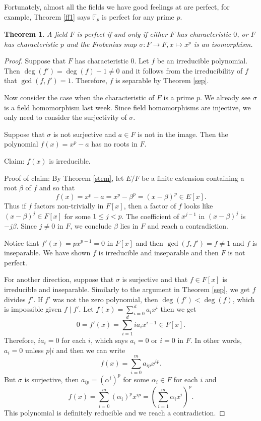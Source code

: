 \documentclass[12pt]{report}
\newtheorem{theorem}{Theorem}[section]
\theoremstyle{definition}
\newcommand{\FF}{\mathbb{F}}
\begin{document}
Fortunately, almost all the fields we have good feelings at are perfect, for example, Theorem \ref{ff1} says $\FF_p$ is perfect for any prime $p$.

\begin{theorem}
	A field $F$ is perfect if and only if either $F$ has characteristic $0$, or $F$ has characteristic $p$ and the Frobenius map $\sigma: F\to F, x\mapsto x^p$ is an isomorphism.
\end{theorem}

\begin{proof}
	Suppose that $F$ has characteristic 0. Let $f$ be an irreducible polynomial. Then $\deg(f')=\deg(f)-1\not=0$ and it follows from the irreducibility of $f$ that $\gcd(f,f')=1$. Therefore, $f$ is separable by Theorem \ref{sep}.

	Now consider the case when the characteristic of $F$ is a prime $p$. We already see $\sigma$ is a field homomorphism last week. Since field homomorphisms are injective, we only need to consider the surjectivity  of $\sigma$.

	Suppose that $\sigma$ is not surjective and $a\in F$ is not in the image. Then the polynomial $f(x)=x^p-a$ has no roots in $F$.

	Claim: $f(x)$ is irreducible.

	Proof of claim: By Theorem \ref{stem}, let $E/F$ be a finite extension containing a root $\beta$ of $f$ and so that $$f(x)=x^p-a=x^p-\beta^p=(x-\beta)^p \in E[x].$$
	Thus if $f$ factors non-trivially in $F[x]$, then a factor of $f$ looks like $(x-\beta)^j \in F[x]$ for some $1\leq j<p$. The coefficient of $x^{j-1}$ in $(x-\beta)^j$ is $-j\beta$. Since $j\not=0$ in $F$, we conclude $\beta$ lies in $F$ and reach a contradiction.

	Notice that $f'(x)=px^{p-1} = 0$ in $F[x]$ and then $\gcd(f,f')=f\not=1$ and $f$ is inseparable. We have shown $f$ is irreducible and inseparable and then $F$ is not perfect.

	For another direction, suppose that $\sigma$ is surjective and that $f\in F[x]$ is irreducible and inseparable. Similarly to the argument in Theorem \ref{sep}, we get $f$ divides $f'$. If $f'$ was not the zero polynomial, then $\deg(f')< \deg(f)$, which is impossible given $f\mid f'$. Let $f(x)=\sum_{i=0}^d a_ix^i$ then we get $$0=f'(x)=\sum_{i=1}^dia_ix^{i-1}\in F[x].$$  Therefore, $ia_i=0$ for each $i$, which says $a_i=0$ or $i=0$ in $F$. In other words, $a_i=0$ unless $p|i$ and then we can write $$f(x)= \sum_{i=0}^m a_{ip}x^{ip}.$$ But $\sigma$ is surjective, then $a_{ip} =  (\alpha^i)^p$ for some $\alpha_i\in F$ for each $i$ and $$f(x) =  \sum_{i=0}^m (\alpha_i)^p x^{ip} = (\sum_{i=1}^m \alpha_ix^i)^p.$$ This polynomial is definitely reducible and we reach a contradiction.
\end{proof}
\end{document}
